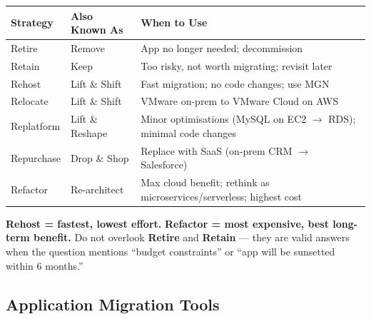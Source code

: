 \begin{comparebox}[title={7Rs Quick Reference}]
\begin{tabular}{@{}p{2.5cm}p{2.5cm}p{6cm}@{}}
\toprule
\textbf{Strategy} & \textbf{Also Known As} & \textbf{When to Use} \\
\midrule
Retire        & Remove             & App no longer needed; decommission \\
Retain        & Keep               & Too risky, not worth migrating; revisit later \\
Rehost        & Lift \& Shift      & Fast migration; no code changes; use MGN \\
Relocate      & Lift \& Shift      & VMware on-prem to VMware Cloud on AWS \\
Replatform    & Lift \& Reshape    & Minor optimisations (MySQL on EC2 $\to$ RDS); minimal code changes \\
Repurchase    & Drop \& Shop       & Replace with SaaS (on-prem CRM $\to$ Salesforce) \\
Refactor      & Re-architect       & Max cloud benefit; rethink as microservices/serverless; highest cost \\
\bottomrule
\end{tabular}
\end{comparebox}

\begin{examtip}
\textbf{Rehost = fastest, lowest effort.} \textbf{Refactor = most expensive, best long-term benefit.} Do not overlook \textbf{Retire} and \textbf{Retain} --- they are valid answers when the question mentions ``budget constraints'' or ``app will be sunsetted within 6 months.''
\end{examtip}

\subsection{Application Migration Tools}

